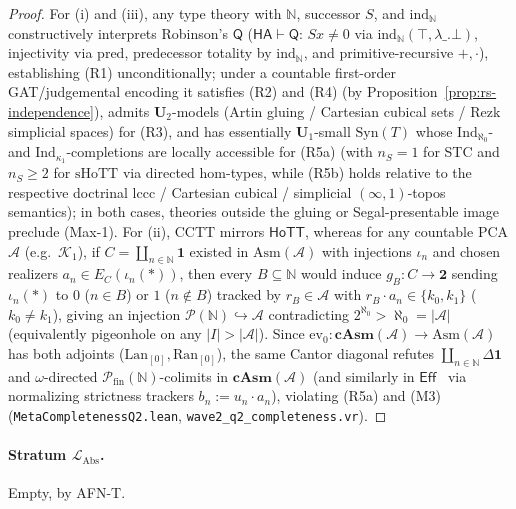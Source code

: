 \documentclass[11pt]{article}
\theoremstyle{plain}
\theoremstyle{definition}
\newcommand{\LAbs}{\mathcal{L}_{\mathrm{Abs}}}
\newcommand{\Syn}{\mathrm{Syn}}
\newcommand{\HoTT}{\mathsf{HoTT}}
\newcommand{\Eff}{\ensuremath{\mathsf{Eff}}}
\begin{document}
\begin{proof}
For (i) and (iii), any type theory with $\mathbb{N}$, successor $S$, and $\mathrm{ind}_{\mathbb{N}}$ constructively interprets Robinson's $\mathsf{Q}$ ($\mathsf{HA} \vdash \mathsf{Q}$: $Sx \neq 0$ via $\mathrm{ind}_{\mathbb{N}}(\top, \lambda\_.\bot)$, injectivity via $\mathrm{pred}$, predecessor totality by $\mathrm{ind}_{\mathbb{N}}$, and primitive-recursive $+, \cdot$), establishing (R1) unconditionally; under a countable first-order GAT/judgemental encoding it satisfies (R2) and (R4) (by Proposition~\ref{prop:rs-independence}), admits $\mathbf{U}_2$-models (Artin gluing / Cartesian cubical sets / Rezk simplicial spaces) for (R3), and has essentially $\mathbf{U}_1$-small $\Syn(T)$ whose $\mathrm{Ind}_{\aleph_0}$- and $\mathrm{Ind}_{\kappa_1}$-completions are locally accessible for (R5a) (with $n_S = 1$ for STC and $n_S \ge 2$ for $\mathrm{sHoTT}$ via directed hom-types, while (R5b) holds relative to the respective doctrinal lccc / Cartesian cubical / simplicial $(\infty,1)$-topos semantics); in both cases, theories outside the gluing or Segal-presentable image preclude (Max-1). For (ii), $\mathrm{CCTT}$ mirrors $\HoTT$, whereas for any countable PCA $\mathcal{A}$ (e.g.\ $\mathcal{K}_1$), if $C = \coprod_{n \in \mathbb{N}} \mathbf{1}$ existed in $\mathrm{Asm}(\mathcal{A})$ with injections $\iota_n$ and chosen realizers $a_n \in E_C(\iota_n(*))$, then every $B \subseteq \mathbb{N}$ would induce $g_B : C \to \mathbf{2}$ sending $\iota_n(*)$ to $0$ ($n \in B$) or $1$ ($n \notin B$) tracked by $r_B \in \mathcal{A}$ with $r_B \cdot a_n \in \{k_0, k_1\}$ ($k_0 \neq k_1$), giving an injection $\mathcal{P}(\mathbb{N}) \hookrightarrow \mathcal{A}$ contradicting $2^{\aleph_0} > \aleph_0 = |\mathcal{A}|$ (equivalently pigeonhole on any $|I| > |\mathcal{A}|$). Since $\mathrm{ev}_0 : \mathbf{cAsm}(\mathcal{A}) \to \mathrm{Asm}(\mathcal{A})$ has both adjoints ($\mathrm{Lan}_{[0]}, \mathrm{Ran}_{[0]}$), the same Cantor diagonal refutes $\coprod_{n \in \mathbb{N}}\Delta\mathbf{1}$ and $\omega$-directed $\mathcal{P}_{\mathrm{fin}}(\mathbb{N})$-colimits in $\mathbf{cAsm}(\mathcal{A})$ (and similarly in $\Eff$~\cite{Hyland1982} via normalizing strictness trackers $b_n := u_n \cdot a_n$), violating (R5a) and (M3) (\texttt{MetaCompletenessQ2.lean}, \texttt{wave2\_q2\_completeness.vr}).
\end{proof}

\paragraph{Stratum $\LAbs$.} Empty, by AFN-T.
\end{document}
